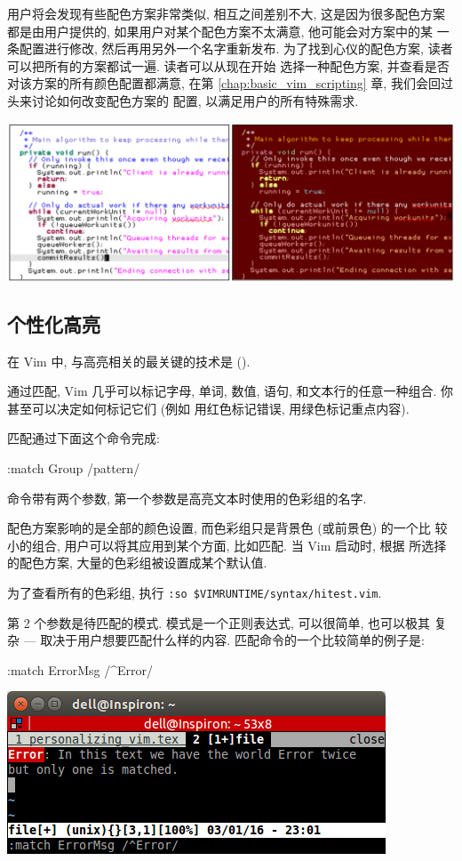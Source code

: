 用户将会发现有些配色方案非常类似, 相互之间差别不大, 这是因为很多配色方案
都是由用户提供的, 如果用户对某个配色方案不太满意, 他可能会对方案中的某
一条配置进行修改, 然后再用另外一个名字重新发布.
为了找到心仪的配色方案, 读者可以把所有的方案都试一遍. 读者可以从现在开始
选择一种配色方案, 并查看是否对该方案的所有颜色配置都满意, 在第
\ref{chap:basic_vim_scripting} 章, 我们会回过头来讨论如何改变配色方案的
配置, 以满足用户的所有特殊需求.
\begin{center}
\includegraphics[scale=0.4]{./images/page22.png}
\end{center}

\subsection{个性化高亮}
\label{subsec:personal_highlighting}
在 Vim 中, 与高亮相关的最关键的技术是  ().

通过匹配, Vim 几乎可以标记字母, 单词, 数值, 语句, 和文本行的任意一种组合.
你甚至可以决定如何标记它们 (例如 用红色标记错误, 用绿色标记重点内容).

匹配通过下面这个命令完成:
\begin{vimcmd}
:match Group /pattern/
\end{vimcmd}
命令带有两个参数, 第一个参数是高亮文本时使用的色彩组的名字.
\begin{warning}
    配色方案影响的是全部的颜色设置, 而色彩组只是背景色 (或前景色) 的一个比
    较小的组合, 用户可以将其应用到某个方面, 比如匹配. 当 Vim 启动时, 根据
    所选择的配色方案, 大量的色彩组被设置成某个默认值.

    为了查看所有的色彩组, 执行 \texttt{:so \$VIMRUNTIME/syntax/hitest.vim}.
\end{warning}
第 2 个参数是待匹配的模式. 模式是一个正则表达式, 可以很简单, 也可以极其
复杂 --- 取决于用户想要匹配什么样的内容. 匹配命令的一个比较简单的例子是:
\begin{vimcmd}
:match ErrorMsg /^Error/
\end{vimcmd}
\begin{center}
\includegraphics[scale=0.7]{./images/page23.png}
\end{center}

